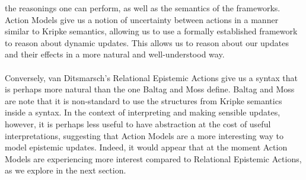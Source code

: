 \documentclass[12pt, a4paper, twoside]{article}
\begin{document}
the reasonings one can perform, as well as the semantics of the frameworks.
\\
Action Models give us a notion of uncertainty between actions in a manner
similar to Kripke semantics, allowing us to use a formally established framework
to reason about dynamic updates.
This allows us to reason about our updates and their effects in a more natural
and well-understood way.\\
\\
Conversely, van Ditsmarsch's Relational Epistemic Actions give us a syntax that
is perhaps more natural than the one Baltag and Moss define.
Baltag and Moss are note that it is non-standard to use the structures from
Kripke semantics inside a syntax.
In the context of interpreting and making sensible updates, however, it is
perhaps less useful to have abstraction at the cost of useful interpretations,
suggesting that Action Models are a more interesting way to model epistemic
updates.
Indeed, it would appear that at the moment Action Models are experiencing more
interest compared to Relational Epistemic Actions, as we explore in the next
section.
\end{document}
